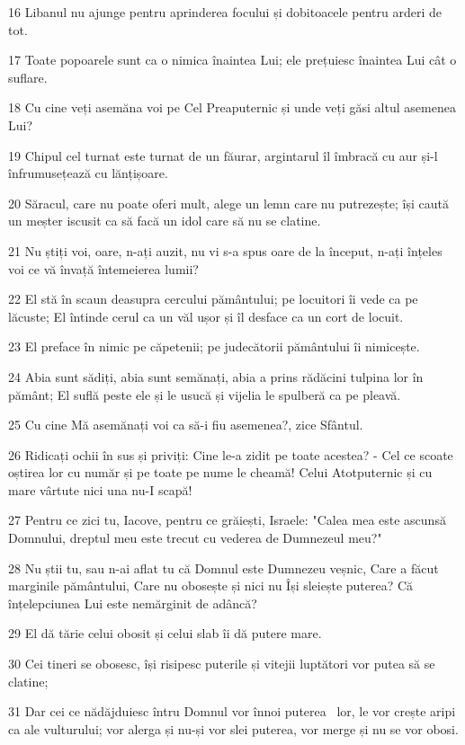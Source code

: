 \par 16 Libanul nu ajunge pentru aprinderea focului și dobitoacele pentru arderi de tot.
\par 17 Toate popoarele sunt ca o nimica înaintea Lui; ele prețuiesc înaintea Lui cât o suflare.
\par 18 Cu cine veți asemăna voi pe Cel Preaputernic și unde veți găsi altul asemenea Lui?
\par 19 Chipul cel turnat este turnat de un făurar, argintarul îl îmbracă cu aur și-l înfrumusețează cu lănțișoare.
\par 20 Săracul, care nu poate oferi mult, alege un lemn care nu putrezește; își caută un meșter iscusit ca să facă un idol care să nu se clatine.
\par 21 Nu știți voi, oare, n-ați auzit, nu vi s-a spus oare de la început, n-ați înțeles voi ce vă învață întemeierea lumii?
\par 22 El stă în scaun deasupra cercului pământului; pe locuitori îi vede ca pe lăcuste; El întinde cerul ca un văl ușor și îl desface ca un cort de locuit.
\par 23 El preface în nimic pe căpetenii; pe judecătorii pământului îi nimicește.
\par 24 Abia sunt sădiți, abia sunt semănați, abia a prins rădăcini tulpina lor în pământ; El suflă peste ele și le usucă și vijelia le spulberă ca pe pleavă.
\par 25 Cu cine Mă asemănați voi ca să-i fiu asemenea?, zice Sfântul.
\par 26 Ridicați ochii în sus și priviți: Cine le-a zidit pe toate acestea? - Cel ce scoate oștirea lor cu număr și pe toate pe nume le cheamă! Celui Atotputernic și cu mare vârtute nici una nu-I scapă!
\par 27 Pentru ce zici tu, Iacove, pentru ce grăiești, Israele: "Calea mea este ascunsă Domnului, dreptul meu este trecut cu vederea de Dumnezeul meu?"
\par 28 Nu știi tu, sau n-ai aflat tu că Domnul este Dumnezeu veșnic, Care a făcut marginile pământului, Care nu obosește și nici nu Își sleiește puterea? Că înțelepciunea Lui este nemărginit de adâncă?
\par 29 El dă tărie celui obosit și celui slab îi dă putere mare.
\par 30 Cei tineri se obosesc, își risipesc puterile și vitejii luptători vor putea să se clatine;
\par 31 Dar cei ce nădăjduiesc întru Domnul vor înnoi puterea  lor, le vor crește aripi ca ale vulturului; vor alerga și nu-și vor slei puterea, vor merge și nu se vor obosi.

